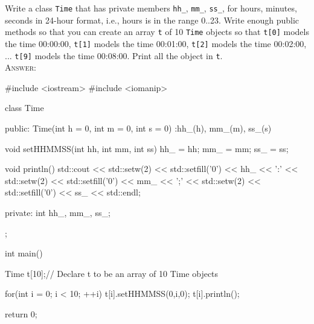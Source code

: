 

\renewcommand\AUTHOR{cadalebout1@cougars.ccis.edu} %


\topmattertwo

\nextq
Write a class \verb!Time! that has private members
\verb!hh_!,
\verb!mm_!,
\verb!ss_!,
for hours, minutes, seconds in 24-hour format, i.e.,
hours is in the range 0..23.
Write enough public methods so that you can 
create an array \verb!t! of 10 \verb!Time! objects
so that
\verb!t[0]! models the time 00:00:00,
\verb!t[1]! models the time 00:01:00,
\verb!t[2]! models the time 00:02:00,
...
\verb!t[9]! models the time 00:08:00.
Print all the object in \verb!t!.
\\
\textsc{Answer:}\vspace{-2mm}
\begin{answercode}
#include <iostream>
#include <iomanip>

class Time
{
public:
    Time(int h = 0, int m = 0, int s = 0)
    :hh_(h), mm_(m), ss_(s)
    {}

    void setHHMMSS(int hh, int mm, int ss)
    {
        hh_ = hh;
        mm_ = mm;
        ss_ = ss;
    }

    void println()
    {
        std::cout << std::setw(2) << std::setfill('0') << hh_ << ':'
                  << std::setw(2) << std::setfill('0') << mm_ << ';'
                  << std::setw(2) << std::setfill('0') << ss_ << std::endl;
    }

private:
int hh_, mm_, ss_;
};

int main()
{
    Time t[10];// Declare t to be an array of 10 Time objects

    for(int i = 0; i < 10; ++i)
    {
        t[i].setHHMMSS(0,i,0);
        t[i].println();
    }

    return 0;
}
\end{answercode}


